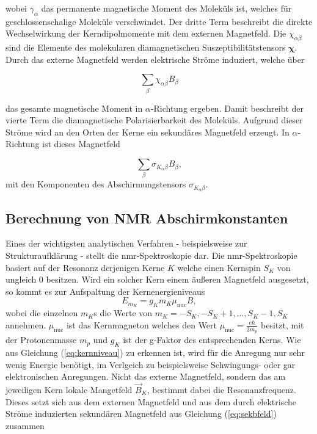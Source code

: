 wobei $\gamma_\alpha$ das permanente magnetische Moment des Moleküls ist, welches für geschlossenschalige Moleküle verschwindet. Der dritte Term beschreibt die direkte Wechselwirkung der Kerndipolmomente mit dem externen Magnetfeld. Die $\chi_{\alpha\beta}$ sind die Elemente des molekularen diamagnetischen Suszeptibilitätstensors $\boldsymbol{\chi}$. Durch das externe Magnetfeld werden elektrische Ströme induziert, welche über 

\begin{equation}
\sum_{\beta}\chi_{\alpha\beta} B_\beta
\end{equation} 

das gesamte magnetische Moment in $\alpha$-Richtung ergeben. Damit beschreibt der vierte Term die diamagnetische Polarisierbarkeit des Moleküls. Aufgrund dieser Ströme wird an den Orten der Kerne ein sekundäres Magnetfeld erzeugt. In $\alpha$-Richtung ist dieses Magnetfeld

\begin{equation}\label{eq:sekbfeld}
\sum_{\beta}\sigma_{K_\alpha\beta} B_\beta,
\end{equation}
mit den Komponenten des Abschirmungstensors $\sigma_{K_\alpha\beta}$.

%

	\subsection{Berechnung von NMR Abschirmkonstanten}\label{theo:nmr}
	Eines der wichtigsten analytischen Verfahren - beispielsweise zur Strukturaufklärung - stellt die \ac{nmr}-Spektroskopie dar. Die \ac{nmr}-Spektroskopie basiert auf der Resonanz derjenigen Kerne $K$ welche einen Kernspin $S_K$ von ungleich 0 besitzen. Wird ein solcher Kern einem äußeren Magnetfeld ausgesetzt, so kommt es zur Aufspaltung der Kernenergieniveaus
\begin{equation}\label{eq:kernniveau}
  E_{m_K}=g_Km_K\mu_{\textrm{nuc}}B,
\end{equation}	
wobei die einzelnen $m_K$s die Werte von $m_K=-S_K, -S_K+1, \dotsc ,S_K-1,S_K$ annehmen. $\mu_{\textrm{nuc}}$ ist das Kernmagneton welches den Wert $\mu_{\textrm{nuc}}=\frac{e\hbar}{2m_p}$ besitzt, mit der Protonenmasse $m_p$ und $g_K$ ist der g-Faktor des entsprechenden Kerns. Wie aus Gleichung (\ref{eq:kernniveau}) zu erkennen ist, wird für die Anregung nur sehr wenig Energie benötigt, im Verlgeich zu beispielsweise Schwingungs- oder gar elektronischen Anregungen. Nicht das externe Magnetfeld, sondern das am jeweiligen Kern lokale Mangetfeld $\vec{B}_K$, bestimmt dabei die Resonanzfrequenz. Dieses setzt sich aus dem externen Magnetfeld und aus dem durch elektrische Ströme induzierten sekundären Magnetfeld aus Gleichung (\ref{eq:sekbfeld}) zusammen

